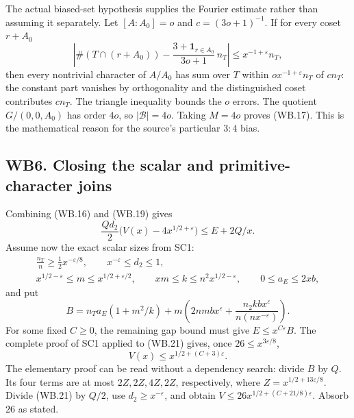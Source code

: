 The actual biased-set hypothesis supplies the Fourier estimate rather
than assuming it separately. Let $[A:A_0]=o$ and
$c=(3o+1)^{-1}$. If for every coset $r+A_0$
\[
 \left|\#(T\cap(r+A_0))-
       \frac{3+\mathbf1_{r\in A_0}}{3o+1}\,n_T\right|
       \le x^{-1+\varepsilon}n_T,
 \tag{WB.20}
\]
then every nontrivial character of $A/A_0$ has sum over $T$ within
$ox^{-1+\varepsilon}n_T$ of $cn_T$: the constant part vanishes
by orthogonality and the distinguished coset contributes $cn_T$.
The triangle inequality bounds the $o$ errors. The quotient
$G/(0,0,A_0)$ has order $4o$, so
$|\mathcal B|=4o$. Taking $M=4o$ proves (WB.17). This is the
mathematical reason for the source's particular $3:4$ bias.

\subsection{WB6. Closing the scalar and primitive-character joins}

Combining (WB.16) and (WB.19) gives
\[
 \frac{Qd_2}{2}\bigl(V(x)-4x^{1/2+\varepsilon}\bigr)
                   \le E+2Q/x.
 \tag{WB.21}
\]
Assume now the exact scalar sizes from SC1:
\begin{gather*}
 \frac{n_T}{n}\ge\tfrac12x^{-\varepsilon/8},\qquad
 x^{-\varepsilon}\le d_2\le1,\\
 x^{1/2-\varepsilon}\le m\le x^{1/2+\varepsilon/2},\qquad
 xm\le k\le n^2x^{1/2-\varepsilon},\qquad
 0\le a_E\le2xb,
\end{gather*}
and put
\[
 B=n_Ta_E(1+m^2/k)
       +m\left(2nmbx^\varepsilon+
                \frac{n_2kbx^\varepsilon}{n(nx^{-\varepsilon})}\right).
 \tag{WB.22}
\]
For some fixed $C\ge0$, the remaining gap bound must give
$E\le x^{C\varepsilon}B$. The complete proof of SC1 applied
to (WB.21) gives, once $26\le x^{3\varepsilon/8}$,
\[
                    V(x)\le x^{1/2+(C+3)\varepsilon}.
 \tag{WB.23}
\]
The elementary proof can be read without a dependency search: divide
$B$ by $Q$. Its four terms are at most $2Z,2Z,4Z,2Z$, respectively,
where $Z=x^{1/2+13\varepsilon/8}$. Divide (WB.21) by $Q/2$,
use $d_2\ge x^{-\varepsilon}$, and obtain
$V\le26x^{1/2+(C+21/8)\varepsilon}$. Absorb $26$ as stated.

